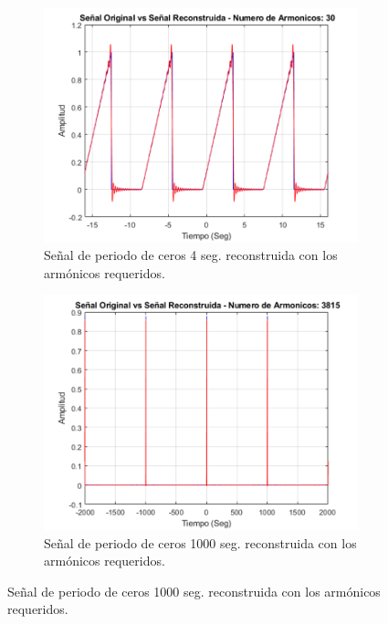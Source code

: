 \documentclass[11pt,a4paper,twocolumn]{article}
\begin{document}
    \begin{figure}[H]
        \centering 
        \begin{subfigure}[h]{0.45\linewidth}
            \includegraphics[width=\linewidth]{img/figure9_A.png}
            \caption{Señal de periodo de ceros 4 seg. reconstruida con los armónicos requeridos.}
            \label{figure9_A}
        \end{subfigure}
        \begin{subfigure}[h]{0.45\linewidth}
            \includegraphics[width=\linewidth]{img/figure9_B.png}
            \caption{Señal de periodo de ceros 1000 seg. reconstruida con los armónicos requeridos.}
            \label{figure9_B}
        \end{subfigure}
        \label{figure9}
    \end{figure}
        
\end{document}
